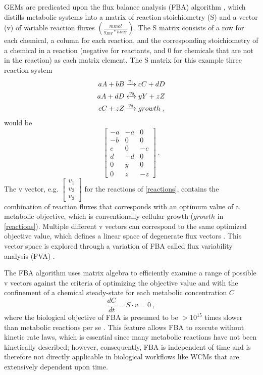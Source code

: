 GEMs are predicated upon the flux balance analysis (FBA) algorithm \cite{Orth2010, Lee2006FluxMetabolomics}, which distills metabolic systems into a matrix of reaction stoichiometry (S) and a vector (v) of variable reaction fluxes $\left( \frac{mmol}{g_{DW}*hour} \right)$. The S matrix consists of a row for each chemical, a column for each reaction, and the corresponding stoichiometry of a chemical in a reaction (negative for reactants, and $0$ for chemicals that are not in the reaction) as each matrix element. The S matrix for this example three reaction system
\begin{equation} \label{reactions}
    \begin{split}
        aA + bB &\xrightarrow{v_1} cC + dD \\
        aA + dD &\xleftrightarrow{v_2} yY + zZ \\ 
        cC + zZ &\xrightarrow{v_3} growth~,
    \end{split}
\end{equation}
would be
\begin{equation} \label{s_matrix}
    \begin{bmatrix}
    -a & -a & 0 \\
    -b & 0 & 0 \\
    c & 0 & -c \\
    d & -d & 0 \\
    0 & y & 0 \\
    0 & z & -z 
    \end{bmatrix}~.
\end{equation}
The v vector, e.g. $\begin{bmatrix} v_1 \\ v_2 \\ v_3 \end{bmatrix}$ for the reactions of \cref{reactions}, contains the combination of reaction fluxes that corresponds with an optimum value of a metabolic objective, which is conventionally cellular growth ($growth$ in \cref{reactions}). Multiple different v vectors can correspond to the same optimized objective value, which defines a linear space of degenerate flux vectors \cite{Nagrath2010SoftAnalysis}. This vector space is explored through a variation of FBA called flux variability analysis (FVA)  \cite{Gianchandani2010TheBiology, Gudmundsson2010ComputationallyAnalysis}. 

The FBA algorithm uses matrix algebra  to efficiently examine a range of possible v vectors against the criteria of optimizing the objective value and with the confinement of a chemical steady-state for each metabolic concentration $C$   
\begin{equation} \label{fba_equation}
    \frac{dC}{dt}=S \cdot v=0~,
\end{equation}
where the biological objective of FBA is presumed to be $>10^{15}$ times slower than metabolic reactions per se \cite{Dantus1987Real-timeReactions}. This feature allows FBA to execute without kinetic rate laws, which is essential since many metabolic reactions have not been kinetically described; however, consequently, FBA is independent of time and is therefore not directly applicable in biological workflows like WCMs that are extensively dependent upon time. 

